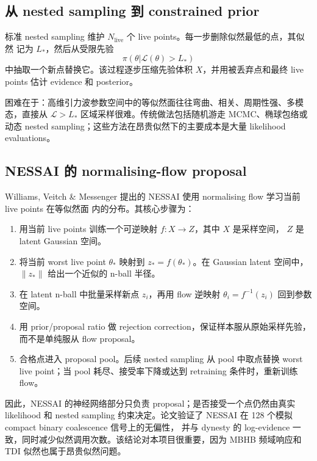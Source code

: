 \documentclass[11pt,a4paper]{ctexart}
\begin{document}
\subsection{从 nested sampling 到 constrained prior}

标准 nested sampling 维护 \(N_\mathrm{live}\) 个 live points。每一步删除似然最低的点，其似然
记为 \(L_\ast\)，然后从受限先验
\[
\pi(\theta | \mathcal{L}(\theta)>L_\ast)
\]
中抽取一个新点替换它。该过程逐步压缩先验体积 \(X\)，并用被丢弃点和最终 live points 估计
evidence 和 posterior。

困难在于：高维引力波参数空间中的等似然面往往弯曲、相关、周期性强、多模态，直接从
\(\mathcal{L}>L_\ast\) 区域采样很难。传统做法包括随机游走 MCMC、椭球包络或动态 nested
sampling；这些方法在昂贵似然下的主要成本是大量 likelihood evaluations。

\subsection{NESSAI 的 normalising-flow proposal}

Williams, Veitch \& Messenger 提出的 NESSAI 使用 normalising flow 学习当前 live points 在等似然面
内的分布\cite{williams2021nessai}。其核心步骤为：
\begin{enumerate}
  \item 用当前 live points 训练一个可逆映射 \(f:X\rightarrow Z\)，其中 \(X\) 是采样空间，
  \(Z\) 是 latent Gaussian 空间。
  \item 将当前 worst live point \(\theta_\ast\) 映射到 \(z_\ast=f(\theta_\ast)\)。在 Gaussian latent
  空间中，\(\|z_\ast\|\) 给出一个近似的 n-ball 半径。
  \item 在 latent n-ball 中批量采样新点 \(z_i\)，再用 flow 逆映射 \(\theta_i=f^{-1}(z_i)\) 回到参数空间。
  \item 用 prior/proposal ratio 做 rejection correction，保证样本服从原始采样先验，而不是单纯服从
  flow proposal。
  \item 合格点进入 proposal pool。后续 nested sampling 从 pool 中取点替换 worst live point；当 pool
  耗尽、接受率下降或达到 retraining 条件时，重新训练 flow。
\end{enumerate}

因此，NESSAI 的神经网络部分只负责 proposal；是否接受一个点仍然由真实 likelihood 和 nested
sampling 约束决定。论文验证了 NESSAI 在 128 个模拟 compact binary coalescence 信号上的无偏性，
并与 dynesty 的 log-evidence 一致，同时减少似然调用次数。该结论对本项目很重要，因为 MBHB
频域响应和 TDI 似然也属于昂贵似然问题。
\end{document}
